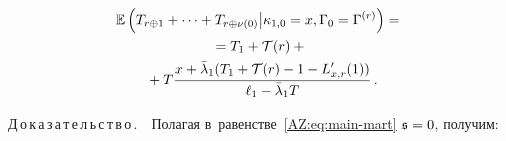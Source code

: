 \begin{multicols}{2}
\vspace*{-6pt}

\noindent
  \begin{multline}
    \mathbb E\left( T_{r\oplus1}+\cdots+T_{r\oplus \nu(0)}\big\vert
    \kappa_{1,0}=x,  \Gamma_0=\Gamma^{(r)}\right)={}    \\ 
    {}=
    T_{1}+\mathcal T(r)+{}\\
    {}+
    T     \displaystyle\frac{\displaystyle x+\bar\lambda_1(T_1+\mathcal T(r)-1-L'_{x,r}(1))\mathstrut}{\displaystyle \ell_1-\bar{\lambda}_1 T\mathstrut}\,.\!\!
    \label{AZ:eq:busy-x-r-1}
  \end{multline}

\noindent
Д\,о\,к\,а\,з\,а\,т\,е\,л\,ь\,с\,т\,в\,о\,.\ \
  Полагая в~равенстве~\eqref{AZ:eq:main-mart} $\mathfrak {s}\hm=0$, %
  получим:
  
  \pagebreak
  

\end{multicols}
